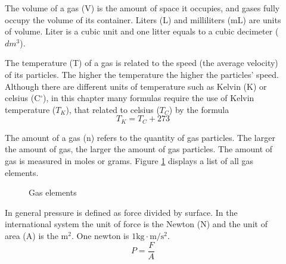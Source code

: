 \documentclass[main.tex]{subfiles}
\begin{document}
\begin{description}
\item[] The volume of a gas (V) is the amount of space it occupies, and gases fully occupy the volume of its container. Liters (L) and milliliters (mL) are units of volume. Liter is a cubic unit and one litter equals to a cubic decimeter ($dm^3$). 
\item[] The temperature (T) of a gas is related to the speed (the average velocity) of its particles. The higher the temperature the higher the particles' speed. Although there are different units of temperature such as Kelvin (K) or celsius (C$^{\circ}$), in this chapter many formulas require the use of Kelvin temperature ($T_K$), that related to celsius ($T_C$) by the formula
\begin{equation*}
\boxed{   T_K=T_C+273}   
\end{equation*}
\item[] The amount of a gas (n) refers to the quantity of gas particles. The larger the amount of gas, the larger the amount of gas particles. The amount of gas is measured in moles or grams. Figure \ref{fig:{\chapterlabel}1} displays a list of all gas elements.

\begin{figure}[h] %
\begin{center}\GasTable\end{center}
\caption{Gas elements}
\label{fig:{\chapterlabel}1}
\end{figure}%










\item[] In general pressure is defined as force divided by surface. In the international system the unit of force is the Newton (N) and the unit of area (A) is the $\text{m}^2$. One newton is $1 \text{kg}\cdot \text{m}/\text{s}^2$.
\begin{equation*}
\boxed{   P=\frac{F}{A}
}   
\end{equation*}


\end{description}
\end{document}
